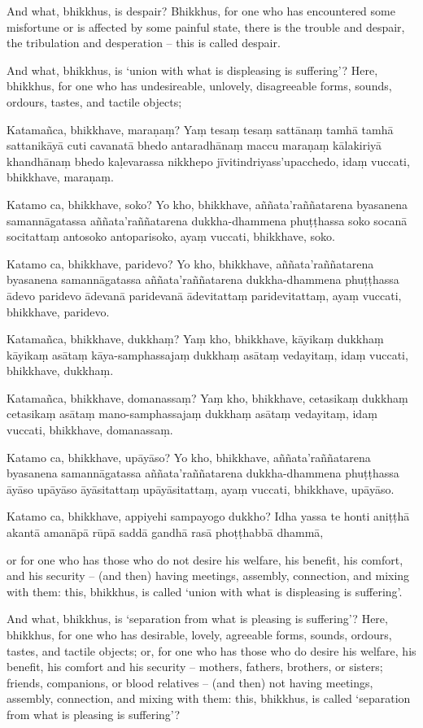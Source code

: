 And what, bhikkhus, is despair? Bhikkhus, for one who has encountered some
misfortune or is affected by some painful state, there is the trouble and
despair, the tribulation and desperation -- this is called despair.

And what, bhikkhus, is `union with what is displeasing is suffering'? Here,
bhikkhus, for one who has undesireable, unlovely, disagreeable forms, sounds,
ordours, tastes, and tactile objects;

\paliPage

Katamañca, bhikkhave, maraṇaṃ? Yaṃ tesaṃ tesaṃ sattānaṃ tamhā tamhā sattanikāyā
cuti cavanatā bhedo antaradhānaṃ maccu maraṇaṃ kālakiriyā khandhānaṃ bhedo
kaḷevarassa nikkhepo jīvitindriyass'upacchedo, idaṃ vuccati, bhikkhave, maraṇaṃ.

Katamo ca, bhikkhave, soko? Yo kho, bhikkhave, aññata'raññatarena byasanena
samannāgatassa aññata'raññatarena dukkha-dhammena phuṭṭhassa soko socanā
socitattaṃ antosoko antoparisoko, ayaṃ vuccati, bhikkhave, soko.

Katamo ca, bhikkhave, paridevo? Yo kho, bhikkhave, aññata'raññatarena
byasanena samannāgatassa aññata'raññatarena dukkha-dhammena phuṭṭhassa
ādevo paridevo ādevanā paridevanā ādevitattaṃ paridevitattaṃ, ayaṃ
vuccati, bhikkhave, paridevo.

Katamañca, bhikkhave, dukkhaṃ? Yaṃ kho, bhikkhave, kāyikaṃ dukkhaṃ kāyikaṃ
asātaṃ kāya-samphassajaṃ dukkhaṃ asātaṃ vedayitaṃ, idaṃ vuccati, bhikkhave,
dukkhaṃ.

Katamañca, bhikkhave, domanassaṃ? Yaṃ kho, bhikkhave, cetasikaṃ dukkhaṃ
cetasikaṃ asātaṃ mano-samphassajaṃ dukkhaṃ asātaṃ vedayitaṃ, idaṃ vuccati,
bhikkhave, domanassaṃ.

Katamo ca, bhikkhave, upāyāso? Yo kho, bhikkhave, aññata'raññatarena byasanena
samannāgatassa aññata'raññatarena dukkha-dhammena phuṭṭhassa āyāso upāyāso
āyāsitattaṃ upāyāsitattaṃ, ayaṃ vuccati, bhikkhave, upāyāso.

Katamo ca, bhikkhave, appiyehi sampayogo dukkho? Idha yassa te honti aniṭṭhā
akantā amanāpā rūpā saddā gandhā rasā phoṭṭhabbā dhammā,

\englishPage

or for one who has those who do not desire his welfare, his benefit, his
comfort, and his security -- (and then) having meetings, assembly, connection,
and mixing with them: this, bhikkhus, is called `union with what is displeasing
is suffering'.

And what, bhikkhus, is `separation from what is pleasing is suffering'? Here,
bhikkhus, for one who has desirable, lovely, agreeable forms, sounds, ordours,
tastes, and tactile objects; or, for one who has those who do desire his
welfare, his benefit, his comfort and his security -- mothers, fathers,
brothers, or sisters; friends, companions, or blood relatives -- (and then) not
having meetings, assembly, connection, and mixing with them: this, bhikkhus, is
called `separation from what is pleasing is suffering'?

